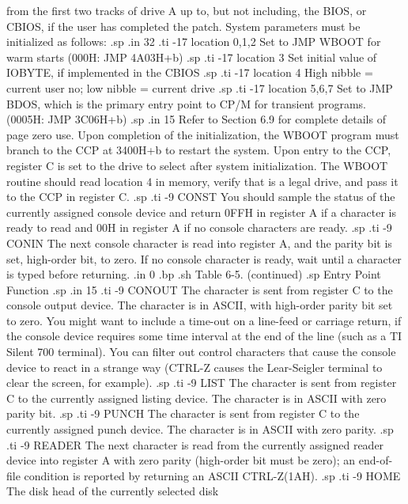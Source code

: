 from the first two tracks of drive A up to, but not including, the BIOS, or
CBIOS, if the user has completed the patch.  System parameters must be
initialized as follows:
.sp
.in 32
.ti -17
location 0,1,2   Set to JMP WBOOT for warm starts (000H: JMP 4A03H+b)
.sp
.ti -17
location 3       Set initial value of IOBYTE, if implemented in the CBIOS
.sp
.ti -17
location 4       High nibble = current user no; low nibble = current drive
.sp
.ti -17
location 5,6,7   Set to JMP BDOS, which is the primary entry point to CP/M for
transient programs.  (0005H: JMP 3C06H+b)
.sp
.in 15
Refer to Section 6.9 for complete details of page zero use.
Upon completion of the initialization, the WBOOT program must branch to the
CCP at 3400H+b to restart the system.  Upon entry to the CCP, register C is
set to the drive to select after system initialization.  The WBOOT routine
should read location 4 in memory, verify that is a legal drive, and pass it
to the CCP in register C.
.sp
.ti -9
CONST    You should sample the status of the currently assigned console
device and return 0FFH in register A if a character is ready to read and 00H
in register A if no console characters are ready.
.sp
.ti -9
CONIN    The next console character is read into register A, and the parity
bit is set, high-order bit, to zero.  If no console character is ready, 
wait until a character is typed before returning.
.in 0
.bp
.sh
                     Table 6-5.  (continued)
.sp
   Entry Point                    Function
.sp
.in 15
.ti -9
CONOUT   The character is sent from register C to the console
output device.  The character is in ASCII, with high-order parity 
bit set to zero.  You might want to include a time-out on a 
line-feed or carriage return, if the console device requires some 
time interval at the end of the line (such as a TI Silent 700  
terminal).  You can filter out control characters that cause 
the console device to react in a strange way (CTRL-Z causes the 
Lear-Seigler terminal to clear the screen, for example).
.sp
.ti -9
LIST     The character is sent from register C to the currently
assigned listing device.  The character is in ASCII with zero 
parity bit.
.sp
.ti -9
PUNCH    The character is sent from register C to the currently
assigned punch device.  The character is in ASCII with zero 
parity.
.sp
.ti -9
READER   The next character is read from the currently assigned reader
device into register A with zero parity (high-order bit must be 
zero); an end-of-file condition is reported by returning an ASCII 
CTRL-Z(1AH).
.sp
.ti -9
HOME     The disk head of the currently selected disk
